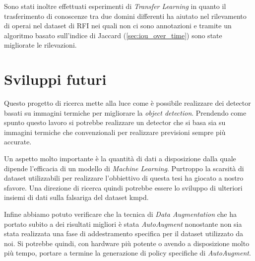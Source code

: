 Sono stati inoltre effettuati esperimenti di \textit{Transfer Learning} in quanto il trasferimento di conoscenze tra due domini differenti ha aiutato nel rilevamento di operai nel dataset di \ac{RFI} nei quali non ci sono annotazioni e tramite un algoritmo basato sull'indice di Jaccard (\ref{sec:iou_over_time}) sono state migliorate le rilevazioni. 


\section{Sviluppi futuri}
Questo progetto di ricerca mette alla luce come è possibile realizzare dei detector basati su immagini termiche per migliorare la \textit{object detection}. Prendendo come spunto questo lavoro si potrebbe realizzare un detector che si basa sia su immagini termiche che convenzionali per realizzare previsioni sempre più accurate.

Un aspetto molto importante è la quantità di dati a disposizione dalla quale dipende l'efficacia di un modello di \textit{Machine Learning}.
Purtroppo la scarsità di dataset utilizzabili per realizzare l'obbiettivo di questa tesi ha giocato a nostro sfavore. Una direzione di ricerca quindi potrebbe essere lo sviluppo di ulteriori insiemi di dati sulla falsariga del dataset \acf{kmpd}. 

Infine abbiamo potuto verificare che la tecnica di \textit{Data Augmentation} che ha portato subito a dei risultati migliori è stata \textit{AutoAugment} nonostante non sia stata realizzata una fase di addestramento specifica per il dataset utilizzato da noi. Si potrebbe quindi, con hardware più potente o avendo a disposizione molto più tempo, portare a termine la generazione di policy specifiche di \textit{AutoAugment}. 